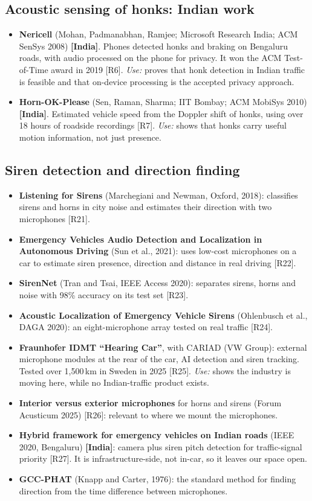 \documentclass[11pt]{article}
\newcommand{\IN}{{\color{sky}\bfseries[India]}}
\renewcommand{\cite}[1]{{\color{navy}[#1]}}
\begin{document}
\subsection{Acoustic sensing of honks: Indian work}
\begin{itemize}[leftmargin=*]
  \item \textbf{Nericell} (Mohan, Padmanabhan, Ramjee; Microsoft Research India; ACM SenSys 2008) \IN. Phones detected honks and braking on Bengaluru roads, with audio processed on the phone for privacy. It won the ACM Test-of-Time award in 2019 \cite{R6}. \emph{Use:} proves that honk detection in Indian traffic is feasible and that on-device processing is the accepted privacy approach.
  \item \textbf{Horn-OK-Please} (Sen, Raman, Sharma; IIT Bombay; ACM MobiSys 2010) \IN. Estimated vehicle speed from the Doppler shift of honks, using over 18 hours of roadside recordings \cite{R7}. \emph{Use:} shows that honks carry useful motion information, not just presence.
\end{itemize}

\subsection{Siren detection and direction finding}
\begin{itemize}[leftmargin=*]
  \item \textbf{Listening for Sirens} (Marchegiani and Newman, Oxford, 2018): classifies sirens and horns in city noise and estimates their direction with two microphones \cite{R21}.
  \item \textbf{Emergency Vehicles Audio Detection and Localization in Autonomous Driving} (Sun et al., 2021): uses low-cost microphones on a car to estimate siren presence, direction and distance in real driving \cite{R22}.
  \item \textbf{SirenNet} (Tran and Tsai, IEEE Access 2020): separates sirens, horns and noise with 98\% accuracy on its test set \cite{R23}.
  \item \textbf{Acoustic Localization of Emergency Vehicle Sirens} (Ohlenbusch et al., DAGA 2020): an eight-microphone array tested on real traffic \cite{R24}.
  \item \textbf{Fraunhofer IDMT ``Hearing Car''}, with CARIAD (VW Group): external microphone modules at the rear of the car, AI detection and siren tracking. Tested over 1,500\,km in Sweden in 2025 \cite{R25}. \emph{Use:} shows the industry is moving here, while no Indian-traffic product exists.
  \item \textbf{Interior versus exterior microphones} for horns and sirens (Forum Acusticum 2025) \cite{R26}: relevant to where we mount the microphones.
  \item \textbf{Hybrid framework for emergency vehicles on Indian roads} (IEEE 2020, Bengaluru) \IN: camera plus siren pitch detection for traffic-signal priority \cite{R27}. It is infrastructure-side, not in-car, so it leaves our space open.
  \item \textbf{GCC-PHAT} (Knapp and Carter, 1976): the standard method for finding direction from the time difference between microphones.
\end{itemize}
\end{document}
